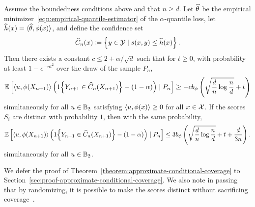 \documentclass{article}
\newcommand{\radphi}{b_{\phi}}
\newcommand{\scorefunc}{s}
\newcommand{\scoreval}{\scorefunc}
\newcommand{\scorerv}{S}
\begin{document}
\begin{theorem}
  \label{theorem:approximate-conditional-coverage}
  Assume the boundedness conditions above and that $n \ge d$.
  Let $\widehat{\theta}$ be the empirical
  minimizer~\eqref{eqn:empirical-quantile-estimator} of the
  $\alpha$-quantile loss, let $\widehat{h}(x) = \langle\widehat{\theta}, \phi(x)\rangle$,
  and define the confidence set
  \begin{equation*}
    \what{C}_n(x) \defeq \left\{y \in \mc{Y}
    \mid \scoreval(x, y) \le \what{h}(x) \right\}.
  \end{equation*}
  Then there exists a constant
  $c \le 2 + \alpha/\sqrt{d}$ such that for $t \ge 0$,
  with probability at least $1 - e^{-n t^2}$ over the draw
  of the sample $P_n$,
  \begin{equation*}
    \E\left[\<u, \phi(X_{n + 1})\>
      \left(\indic{Y_{n + 1} \in \what{C}_n(X_{n+1})}
      - (1 - \alpha)\right) \mid P_n \right]
    \ge -c \radphi \left(\sqrt{\frac{d}{n}  \log \frac{n}{d}}
    + t \right)
  \end{equation*}
  simultaneously for all $u \in \mathbb{B}_2$
  satisfying $\langle u, \phi(x)\rangle \ge 0$ for all $x \in \mathcal{X}$.
  If the scores $\scorerv_i$ are distinct with probability $1$,
  then with the same probability,
  \begin{equation*}
    \E\left[\<u, \phi(X_{n + 1})\>
      \left(\indic{Y_{n + 1} \in \what{C}_n(X_{n+1})}
      - (1 - \alpha)\right) \mid P_n \right]
    \le 3 \radphi \left(\sqrt{\frac{d}{n} \log \frac{n}{d}}
    + t + \frac{d}{3n} \right).
  \end{equation*}
  simultaneously for all $u \in \mathbb{B}_2$.
\end{theorem}
\noindent
We defer the proof of Theorem~\ref{theorem:approximate-conditional-coverage}
to Section~\ref{sec:proof-approximate-conditional-coverage}.
%
We also note in passing that by randomizing, it is possible to make
the scores distinct without sacrificing coverage~\cite[cf.][]{GibbsChCa25}.
\end{document}
